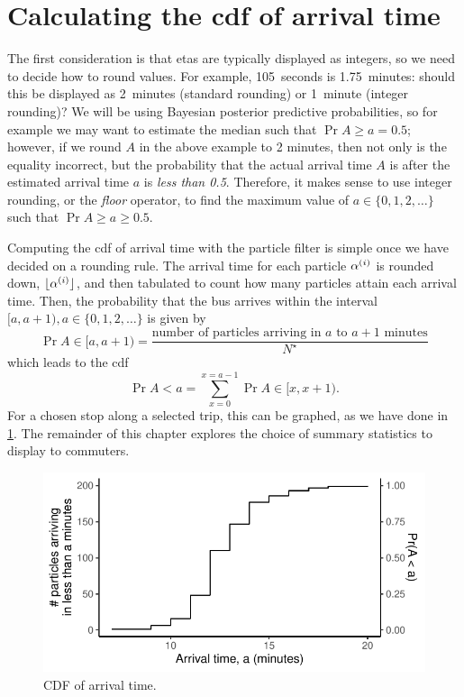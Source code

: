 
\section{Calculating the \gls{cdf} of arrival time}
\label{sec:etas_cdfs}

The first consideration is that \glspl{eta} are typically displayed as integers, so we need to decide how to round values. For example, 105~seconds is 1.75~minutes: should this be displayed as 2~minutes (standard rounding) or 1~minute (integer rounding)? We will be using Bayesian posterior predictive probabilities, so for example we may want to estimate the median such that $\Pr{A \geq a} = 0.5$; however, if we round $A$ in the above example to 2 minutes, then not only is the equality incorrect, but the probability that the actual arrival time $A$ is after the estimated arrival time $a$ is \emph{less than 0.5}. Therefore, it makes sense to use integer rounding, or the \emph{floor} operator, to find the maximum value of $a \in \{0, 1, 2, \ldots\}$ such that $\Pr{A \geq a} \geq 0.5$.


Computing the \gls{cdf} of arrival time with the particle filter is simple once we have decided on a rounding rule. The arrival time for each particle $\alpha^{(i)}$ is rounded down, $\lfloor\alpha^{(i)}\rfloor$, and then tabulated to count how many particles attain each arrival time. Then, the probability that the bus arrives within the interval $[a, a+1), a\in\{0,1,2,\ldots\}$ is given by
\begin{equation}
\label{eq:pf_pdf_arrivaltime}
\Pr{A \in [a, a+1)} =
\frac{\text{number of particles arriving in $a$ to $a+1$~minutes}}{N^\star}
\end{equation}
which leads to the \gls{cdf}
\begin{equation}
\label{eq:pf_cdf_arrivaltime}
\Pr{A < a} = \sum_{x=0}^{x=a-1} \Pr{A \in [x, x+1)}.
\end{equation}
For a chosen stop along a selected trip, this can be graphed, as we have done in \cref{fig:eta_cdf}. The remainder of this chapter explores the choice of summary statistics to display to commuters.

\begin{knitrout}
\color{fgcolor}\begin{figure}

{\centering \includegraphics[width=.8\textwidth]{figure/eta_cdf-1} 

}

\caption[CDF of arrival time]{CDF of arrival time.}\label{fig:eta_cdf}
\end{figure}


\end{knitrout}
